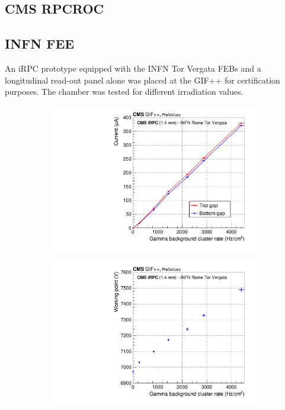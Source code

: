 		\subsection{CMS RPCROC}
		\label{chapt6:ssec:RPCROCcert}
	
		\subsection{INFN FEE}
		\label{chapt6:ssec:INFNcert}
		
	An iRPC prototype equipped with the INFN Tor Vergata FEBs and a longitudinal read-out panel alone was placed at the GIF++ for certification purposes. The chamber was tested for different irradiation values.
	 
	\begin{figure}[H]
		\begin{subfigure}{.5\linewidth}
		    \centering
			\includegraphics[width = \linewidth]{fig/chapt6/CMS-iRPC-INFN-Current_vs_Rate.pdf}
			\caption{\label{fig:iRPC_INFN_perf:A}}
		\end{subfigure}
		\begin{subfigure}{.5\linewidth}
		    \centering
			\includegraphics[width = \linewidth]{fig/chapt6/CMS-iRPC-INFN-WorkingPoint_vs_Rate.pdf}

\end{subfigure}
\end{figure}
